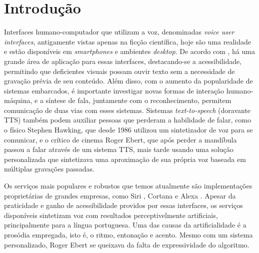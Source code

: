 


\chapter{Introdução}

Interfaces humano-computador que utilizam a voz, denominadas \emph{voice user
  interfaces}, antigamente vistas apenas na ficção científica, hoje são uma
realidade e estão disponíveis em \emph{smartphones} e ambientes \emph{desktop}.
De acordo com \cite{tts-book, martinjurafsky}, há uma grande área de aplicação
para essas interfaces, destacando-se a acessibilidade, permitindo que
deficientes visuais possam ouvir texto sem a necessidade de gravação prévia de
seu conteúdo. Além disso, com o aumento da popularidade de sistemas embarcados,
é importante investigar novas formas de interação humano-máquina, e a síntese de
fala, juntamente com o reconhecimento, permitem comunicação de duas vias com
esses sistemas. Sistemas \emph{text-to-speech} (doravante TTS) também podem
auxiliar pessoas que perderam a habilidade de falar, como o físico Stephen
Hawking, que desde 1986 utilizou um sintetizador de voz para se comunicar, e o
crítico de cinema Roger Ebert, que após perder a mandíbula passou a falar
através de um sistema TTS, mais tarde usando uma solução personalizada que
sintetizava uma aproximação de sua própria voz baseada em múltiplas gravações
passadas. %

Os serviços mais populares e robustos que temos atualmente são implementações proprietárias de grandes empresas, como Siri \cite{siri}, Cortana \cite{cortana} e Alexa \cite{alexa}. Apesar da praticidade e ganho de acessibilidade providos por essas interfaces, os serviços disponíveis sintetizam voz com resultados perceptivelmente artificiais, principalmente para a língua portuguesa. Uma das causas da artificialidade é a prosódia empregada, isto é, o ritmo, entonação e acento. Mesmo com um sistema personalizado, Roger Ebert se queixava da falta de expressividade do algoritmo.

